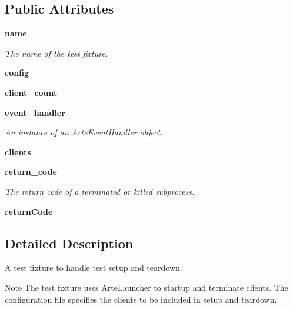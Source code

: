 \subsection*{Public Attributes}
\begin{DoxyCompactItemize}
\item 
{\bf name}
\begin{DoxyCompactList}\small\item\em The name of the test fixture. \end{DoxyCompactList}\item 
{\bfseries config}\label{classarte__test_1_1_arte_test_fixture_a7e447fee46d5124e5d7ba9797ecc4120}

\item 
{\bfseries client\+\_\+count}\label{classarte__test_1_1_arte_test_fixture_ac02585f8f6c1fa8cae84ac394002bc84}

\item 
{\bf event\+\_\+handler}
\begin{DoxyCompactList}\small\item\em An instance of an Arte\+Event\+Handler object. \end{DoxyCompactList}\item 
{\bfseries clients}\label{classarte__test_1_1_arte_test_fixture_a0ce25bc979d417989f0ae2d4d30e828b}

\item 
{\bf return\+\_\+code}\label{classarte__test_1_1_arte_test_fixture_a0d9a1e9ef871ed25068a91f2d693e6be}

\begin{DoxyCompactList}\small\item\em The return code of a terminated or killed subprocess. \end{DoxyCompactList}\item 
{\bfseries return\+Code}\label{classarte__test_1_1_arte_test_fixture_a27442f942d329a4d3b8ef348fabb79b6}

\end{DoxyCompactItemize}


\subsection{Detailed Description}
A test fixture to handle test setup and teardown. 

\begin{DoxyNote}{Note}
The test fixture uses Arte\+Launcher to startup and terminate clients. The configuration file specifies the clients to be included in setup and teardown.
\end{DoxyNote}

